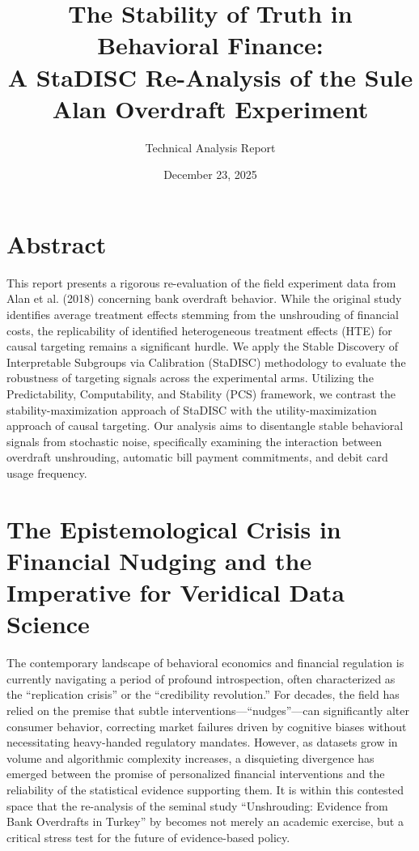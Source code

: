 \documentclass[11pt,a4paper]{article}
\title{The Stability of Truth in Behavioral Finance: \\ A StaDISC Re-Analysis of the Sule Alan Overdraft Experiment}
\author{Technical Analysis Report}
\date{December 23, 2025}
\begin{document}
	
	\maketitle
	
	\section*{Abstract}
	This report presents a rigorous re-evaluation of the field experiment data from Alan et al. (2018) concerning bank overdraft behavior. While the original study identifies average treatment effects stemming from the unshrouding of financial costs, the replicability of identified heterogeneous treatment effects (HTE) for causal targeting remains a significant hurdle. We apply the Stable Discovery of Interpretable Subgroups via Calibration (StaDISC) methodology to evaluate the robustness of targeting signals across the experimental arms. Utilizing the Predictability, Computability, and Stability (PCS) framework, we contrast the stability-maximization approach of StaDISC with the utility-maximization approach of causal targeting. Our analysis aims to disentangle stable behavioral signals from stochastic noise, specifically examining the interaction between overdraft unshrouding, automatic bill payment commitments, and debit card usage frequency.
	
	\section{The Epistemological Crisis in Financial Nudging and the Imperative for Veridical Data Science}
	The contemporary landscape of behavioral economics and financial regulation is currently navigating a period of profound introspection, often characterized as the ``replication crisis'' or the ``credibility revolution.'' For decades, the field has relied on the premise that subtle interventions---``nudges''---can significantly alter consumer behavior, correcting market failures driven by cognitive biases without necessitating heavy-handed regulatory mandates. However, as datasets grow in volume and algorithmic complexity increases, a disquieting divergence has emerged between the promise of personalized financial interventions and the reliability of the statistical evidence supporting them. It is within this contested space that the re-analysis of the seminal study ``Unshrouding: Evidence from Bank Overdrafts in Turkey'' by \citet{alan2018} becomes not merely an academic exercise, but a critical stress test for the future of evidence-based policy.
	
\end{document}
